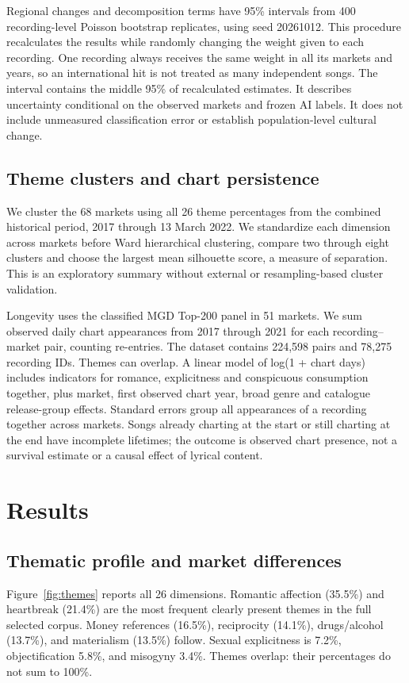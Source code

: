 \documentclass[10pt,a4paper,twocolumn]{article}
\begin{document}
Regional changes and decomposition terms have 95\% intervals from 400 recording-level Poisson bootstrap replicates, using seed 20261012. This procedure recalculates the results while randomly changing the weight given to each recording. One recording always receives the same weight in all its markets and years, so an international hit is not treated as many independent songs. The interval contains the middle 95\% of recalculated estimates. It describes uncertainty conditional on the observed markets and frozen AI labels. It does not include unmeasured classification error or establish population-level cultural change.

\subsection{Theme clusters and chart persistence}
We cluster the 68 markets using all 26 theme percentages from the combined historical period, 2017 through 13 March 2022. We standardize each dimension across markets before Ward hierarchical clustering, compare two through eight clusters and choose the largest mean silhouette score, a measure of separation. This is an exploratory summary without external or resampling-based cluster validation.

Longevity uses the classified MGD Top-200 panel in 51 markets. We sum observed daily chart appearances from 2017 through 2021 for each recording--market pair, counting re-entries. The dataset contains 224,598 pairs and 78,275 recording IDs. Themes can overlap. A linear model of log(1 + chart days) includes indicators for romance, explicitness and conspicuous consumption together, plus market, first observed chart year, broad genre and catalogue release-group effects. Standard errors group all appearances of a recording together across markets. Songs already charting at the start or still charting at the end have incomplete lifetimes; the outcome is observed chart presence, not a survival estimate or a causal effect of lyrical content.


\section{Results}
\subsection{Thematic profile and market differences}
Figure~\ref{fig:themes} reports all 26 dimensions. Romantic affection (35.5\%) and heartbreak (21.4\%) are the most frequent clearly present themes in the full selected corpus. Money references (16.5\%), reciprocity (14.1\%), drugs/alcohol (13.7\%), and materialism (13.5\%) follow. Sexual explicitness is 7.2\%, objectification 5.8\%, and misogyny 3.4\%. Themes overlap: their percentages do not sum to 100\%.
\end{document}
